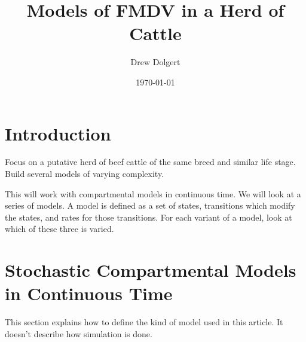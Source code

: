 \documentclass{article}
\title{Models of FMDV in a Herd of Cattle}
\author{Drew Dolgert}
\date{\today}
\begin{document}
\maketitle
{}

\section{Introduction}
Focus on a putative herd of beef cattle of the same breed and similar life stage.
Build several models of varying complexity.

This will work with compartmental models in continuous time.
We will look at a series of models. A model is defined as a set
of states, transitions which modify the states, and rates for those
transitions. For each variant of a model, look at which of these
three is varied.

\section{Stochastic Compartmental Models in Continuous Time}
This section explains how to define the kind of model used
in this article. It doesn't describe how simulation is done.
\end{document}
